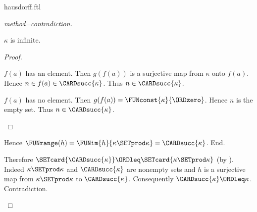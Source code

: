 \documentclass{stex}
\begin{document}
\begin{smodule}{hausdorff.ftl}
\begin{forthel}
\begin{proof}[method=contradiction]
\begin{case}{$\kappa$ is infinite.}
\begin{proof}
          \begin{case}{$f(a)$ has an element.}
            Then $g(f(a))$ is a surjective map from $\kappa$ onto $f(a)$.
            Hence $n \in f(a) \in \CARDsucc{\kappa}$.
            Thus $n \in \CARDsucc{\kappa}$.
          \end{case}
  
          \begin{case}{$f(a)$ has no element.}
            Then $g(f(a)) = \FUNconst{\kappa}{\ORDzero}$.
            Hence $n$ is the empty set.
            Thus $n \in \CARDsucc{\kappa}$.
          \end{case}
        \end{proof}
  
        Hence $\FUNrange(h) = \FUNim{h}{\kappa \SETprod \kappa} = \CARDsucc{\kappa}$.
      End.
  
      Therefore $\SETcard{\CARDsucc{\kappa}} \ORDleq \SETcard{\kappa \SETprod \kappa}$ (by ).
      Indeed $\kappa \SETprod \kappa$ and $\CARDsucc{\kappa}$ are nonempty sets and $h$ is a surjective map from $\kappa \SETprod \kappa$ to $\CARDsucc{\kappa}$.
      Consequently $\CARDsucc{\kappa} \ORDleq \kappa$.
      Contradiction.
    \end{case}
  \end{proof}
\end{forthel}

\printbibliography
{}
\end{smodule}
\end{document}
